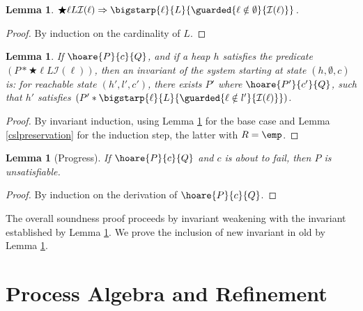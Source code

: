 \documentclass{amsbook}
\newtheorem{lemma}[theorem]{Lemma}
\theoremstyle{definition}
\theoremstyle{remark}
\numberwithin{section}{chapter}
\numberwithin{equation}{chapter}
\begin{document}
\begin{lemma}\label{nonelocked}
  $\bigstar{\ell}{L}{\mathcal I(\ell)} \Rightarrow \bigstarp{\ell}{L}{\guarded{\ell \notin \emptyset}{\mathcal I(\ell)}}$.
\end{lemma}
\begin{proof}
  By induction on the cardinality of $L$.
\end{proof}

\begin{lemma}\label{cslinvariant}
  If $\hoare{P}{c}{Q}$, and if a heap $h$ satisfies the predicate $(P * \bigstar{\ell}{L}{\mathcal I(\ell)})$, then an invariant of the system starting at state $(h, \emptyset, c)$ is: for reachable state $(h', l', c')$, there exists $P'$ where $\hoare{P'}{c'}{Q}$, such that $h'$ satisfies $(P' * \bigstarp{\ell}{L}{\guarded{\ell \notin l'}{\mathcal I(\ell)}})$.
\end{lemma}
\begin{proof}
  By invariant induction, using Lemma \ref{nonelocked} for the base case and Lemma \ref{cslpreservation} for the induction step, the latter with $R = \emp$.
\end{proof}

\begin{lemma}[Progress]\label{cslprogress}
  If $\hoare{P}{c}{Q}$ and $c$ is about to fail, then $P$ is unsatisfiable.
\end{lemma}
\begin{proof}
  By induction on the derivation of $\hoare{P}{c}{Q}$.
\end{proof}

The overall soundness proof proceeds by invariant weakening with the invariant established by Lemma \ref{cslinvariant}.
We prove the inclusion of new invariant in old by Lemma \ref{cslprogress}.



\chapter{\label{process_algebra}Process Algebra and Refinement}
\end{document}
